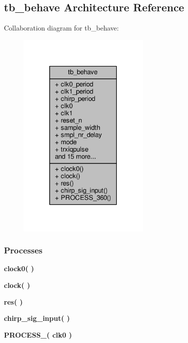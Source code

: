 \subsection{tb\+\_\+behave Architecture Reference}
\label{classrx__path__top__tb_1_1tb__behave}


Collaboration diagram for tb\+\_\+behave\+:\nopagebreak
\begin{figure}[H]
\begin{center}
\leavevmode
\includegraphics[width=182pt]{de/d46/classrx__path__top__tb_1_1tb__behave__coll__graph}
\end{center}
\end{figure}
\subsubsection*{Processes}
 \begin{DoxyCompactItemize}
\item 
{\bf clock0}{\bfseries  (  )}
\item 
{\bf clock}{\bfseries  (  )}
\item 
{\bf res}{\bfseries  (  )}
\item 
{\bf chirp\+\_\+sig\+\_\+input}{\bfseries  (  )}
\item 
{\bf P\+R\+O\+C\+E\+S\+S\+\_}{\bfseries  ( {\bfseries {\bfseries {\bf clk0}} \textcolor{vhdlchar}{ }} )}
\end{DoxyCompactItemize}

